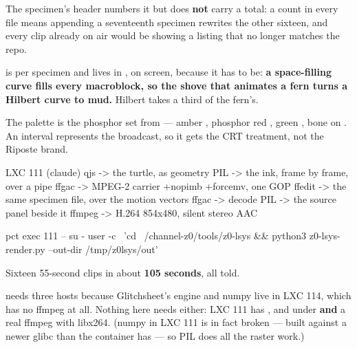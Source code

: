 \documentclass[fontpath=fonts/,logopath=logo/]{riposte-doc}
\begin{document}
The specimen's header numbers it but does \textbf{not} carry a total: a count in every file means appending a seventeenth specimen rewrites the other sixteen, and every clip already on air would be showing a listing that no longer matches the repo.

 is per specimen and lives in , on screen, because it has to be: \textbf{a space-filling curve fills every macroblock, so the shove that animates a fern turns a Hilbert curve to mud.} Hilbert takes a third of the fern's.

The palette is the phosphor set from  — amber , phosphor red , green , bone  on . An interval represents the broadcast, so it gets the CRT treatment, not the Riposte brand.



\ripcodeopen
{}
\begin{ripcodeblock}
LXC 111 (claude)
  qjs      -> the turtle, as geometry
  PIL      -> the ink, frame by frame, over a pipe
  ffgac    -> MPEG-2 carrier          +nopimb +forcemv, one GOP
  ffedit   -> the same specimen file, over the motion vectors
  ffgac    -> decode
  PIL      -> the source panel beside it
  ffmpeg   -> H.264 854x480, silent stereo AAC
\end{ripcodeblock}
\ripcodesizereset\ripcodeclose

\ripcodeopen
{}
\begin{ripcodeblock}
pct exec 111 -- su - user -c \
  'cd ~/channel-z0/tools/z0-lsys && python3 z0-lsys-render.py --out-dir /tmp/z0lsys/out'
\end{ripcodeblock}
\ripcodesizereset\ripcodeclose

Sixteen 55-second clips in about \textbf{105 seconds}, all told.

 needs three hosts because Glitchsheet's engine and numpy live in LXC 114, which has no ffmpeg at all. Nothing here needs either: LXC 111 has ,  and  under  \textbf{and} a real ffmpeg with libx264. (numpy in LXC 111 is in fact broken — built against a newer glibc than the container has — so PIL does all the raster work.)


\end{document}
